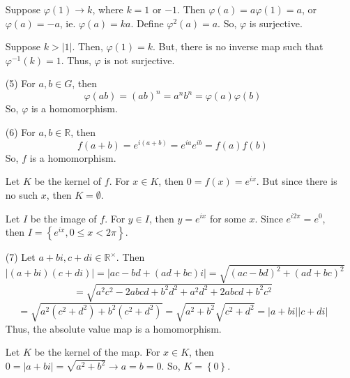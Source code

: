 \begin{itemize}
Suppose $\varphi(1) \rightarrow k$, where $k = 1$ or $-1$. Then $\varphi(a) = a\varphi(1) = a$, or $\varphi(a) = -a$, ie. $\varphi(a) = ka$. Define $\varphi^2(a) = a$. So, $\varphi$ is surjective.

Suppose $k > |1|$. Then, $\varphi(1) = k$. But, there is no inverse map such that $\varphi^{-1}(k) = 1$. Thus, $\varphi$ is not surjective.
\item[(5)]
For $a, b \in G$, then
$$\varphi(ab) = (ab)^n = a^nb^n = \varphi(a)\varphi(b)$$
So, $\varphi$ is a homomorphism.
\item[(6)]
For $a, b \in \mathbb{R}$, then
$$f(a+b) = e^{i(a+b)} = e^{ia}e^{ib} = f(a)f(b)$$
So, $f$ is a homomorphism. 

Let $K$ be the kernel of $f$. For $x \in K$, then $0 = f(x) = e^{ix}$. But since there is no such $x$, then $K = \emptyset$.

Let $I$ be the image of $f$. For $y \in I$, then $y = e^{ix}$ for some $x$. Since $e^{i2\pi} = e^0$, then $I = \left\lbrace e^{ix}, 0 \leq x < 2\pi \right\rbrace$. 
\item[(7)]
Let $a + bi, c + di \in \mathbb{R}^\times$. Then
$$|(a+bi)(c+di)| = |ac - bd + (ad + bc)i| = \sqrt{(ac-bd)^2 + (ad+bc)^2}$$
$$= \sqrt{a^2c^2 - 2abcd + b^2d^2 + a^2d^2 + 2abcd + b^2c^2}$$ 
$$= \sqrt{a^2(c^2 + d^2) + b^2(c^2 + d^2)} = \sqrt{a^2+b^2}\sqrt{c^2+d^2} = |a+bi||c+di|$$
Thus, the absolute value map is a homomorphism.

Let $K$ be the kernel of the map. For $x \in K$, then $0 = |a + bi| = \sqrt{a^2 + b^2} \rightarrow a = b = 0$. So, $K = \left\lbrace 0 \right\rbrace$.


\end{itemize}
